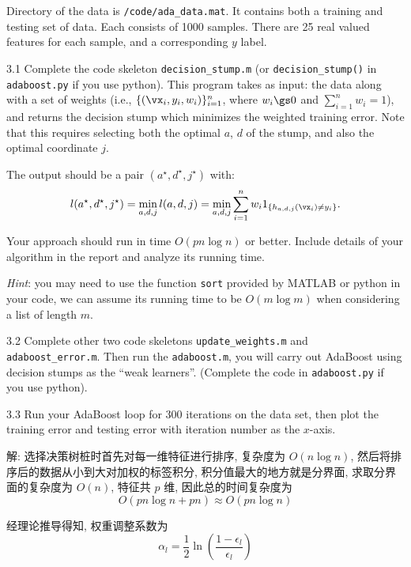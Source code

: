 \documentclass[openany]{ctexbook}
\theoremstyle{kaiti}
\theoremstyle{normal}
\begin{document}
Directory of the data is \verb|/code/ada_data.mat|. It contains both a training and testing set of data. Each consists of 1000 samples. There are 25 real valued features for each sample, and a corresponding $y$ label.

3.1 Complete the code skeleton \verb|decision_stump.m| (or \verb|decision_stump()| in \verb|adaboost.py| if you use python). This program takes as input: the data along with a set of weights (i.e., $\{(\vx_{i}, y_{i}, w_{i})\}_{i=1}^{n}$, where $w_{i} \gs 0$ and $\sum_{i=1}^{n}w_{i}=1$), and returns the decision stump which minimizes the weighted training error. Note that this requires selecting both the optimal $a$, $d$ of the stump, and also the optimal coordinate $j$.

The output should be a pair $(a^{\star}, d^{\star}, j^{\star})$ with:
\begin{eqnarray}
l(a^{\star}, d^{\star}, j^{\star})=\min_{a, d, j}l(a, d, j)=\min_{a, d, j}\sum_{i=1}^{n}w_{i}1_{\{h_{a, d, j}(\vx_{i})\neq y_{i}\}}.
\end{eqnarray}

Your approach should run in time $O(pn\log n)$ or better. Include details of your algorithm in the report and analyze its running time.

\emph{Hint}: you may need to use the function \verb|sort| provided by MATLAB or python in your code, we can assume its running time to be $O(m \log m)$ when considering a list of length $m$.

3.2 Complete other two code skeletons \verb|update_weights.m| and \verb|adaboost_error.m|. Then run the \verb|adaboost.m|, you will carry out AdaBoost using decision stumps as the ``weak learners''. (Complete the code in \verb|adaboost.py| if you use python).

3.3 Run your AdaBoost loop for 300 iterations on the data set, then plot the training error and testing error with iteration number as the $x$-axis.

解: 选择决策树桩时首先对每一维特征进行排序, 复杂度为 $O(n\log n)$, 然后将排序后的数据从小到大对加权的标签积分, 积分值最大的地方就是分界面, 求取分界面的复杂度为 $O(n)$, 特征共 $p$ 维, 因此总的时间复杂度为
\begin{equation}
  O(pn\log n+pn)\approx O(pn\log n)
\end{equation}

经理论推导得知, 权重调整系数为
\begin{equation}
  \alpha_l=\frac{1}{2}\ln\left(\frac{1-\epsilon_l}{\epsilon_l}\right)
\end{equation}
\end{document}
